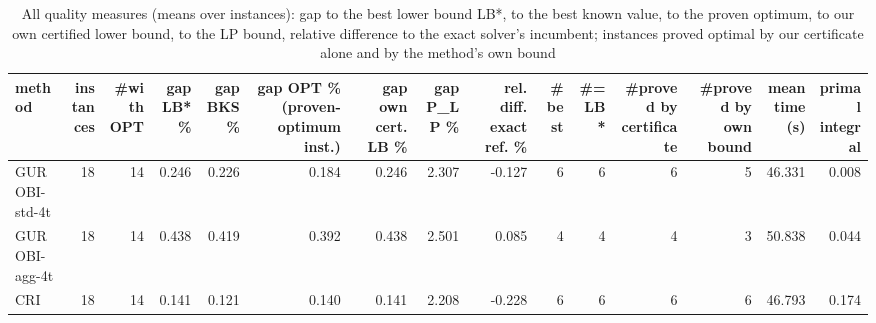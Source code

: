 \begin{table}[htbp]
\centering
\small
\caption{All quality measures (means over instances): gap to the best lower bound LB*, to the best known value, to the proven optimum, to our own certified lower bound, to the LP bound, relative difference to the exact solver's incumbent; instances proved optimal by our certificate alone and by the method's own bound}
\label{tab:E7_gurobi_threads_b60_all_metrics}
\begin{tabular}{lrrrrrrrrrrrrrr}
\toprule
method & instances & \#with OPT & gap LB* \% & gap BKS \% & gap OPT \% (proven-optimum inst.) & gap own cert. LB \% & gap P\_LP \% & rel. diff. exact ref. \% & \#best & \#= LB* & \#proved by certificate & \#proved by own bound & mean time (s) & primal integral \\
\midrule
GUROBI-std-4t & 18 & 14 & 0.246 & 0.226 & 0.184 & 0.246 & 2.307 & -0.127 & 6 & 6 & 6 & 5 & 46.331 & 0.008 \\
GUROBI-agg-4t & 18 & 14 & 0.438 & 0.419 & 0.392 & 0.438 & 2.501 & 0.085 & 4 & 4 & 4 & 3 & 50.838 & 0.044 \\
CRI & 18 & 14 & 0.141 & 0.121 & 0.140 & 0.141 & 2.208 & -0.228 & 6 & 6 & 6 & 6 & 46.793 & 0.174 \\
\bottomrule
\end{tabular}
\end{table}
